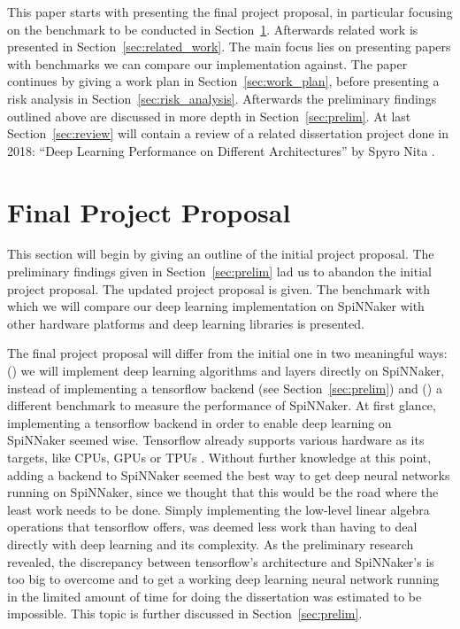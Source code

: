 \documentclass{article}
\begin{document}
This paper starts with presenting the final project
proposal, in particular focusing on the benchmark to be
conducted in Section~\ref{sec:proposal}.
Afterwards related work is presented in
Section~\ref{sec:related_work}.
The main focus lies on presenting papers with benchmarks
we can compare our implementation against.
The paper continues by giving a work plan in
Section~\ref{sec:work_plan}, before presenting a risk
analysis in Section~\ref{sec:risk_analysis}.
Afterwards the preliminary findings outlined above are
discussed in more depth in Section~\ref{sec:prelim}.
At last Section~\ref{sec:review} will contain a review of a
related dissertation project done in 2018:
``Deep Learning Performance on Different Architectures'' by
Spyro Nita \citep{nita_2018}.


\section{Final Project Proposal} %
\label{sec:proposal}

This section will begin by giving an outline of the initial
project proposal.
The preliminary findings given in Section~\ref{sec:prelim}
lad us to abandon the initial project proposal.
The updated project proposal is given.
The benchmark with which we will compare our deep learning
implementation on SpiNNaker with other hardware platforms
and deep learning libraries is presented.

The final project proposal will differ from the initial one
in two meaningful ways: () we will implement
deep learning algorithms and layers directly on SpiNNaker,
instead of implementing a tensorflow backend (see
Section~\ref{sec:prelim}) and () a different
benchmark to measure the performance of SpiNNaker.
At first glance, implementing a tensorflow backend in order to
enable deep learning on SpiNNaker seemed wise.
Tensorflow already supports various hardware as its targets, like
CPUs, GPUs or TPUs \citep{tf2015, jouppi_2016}.
Without further knowledge at this point, adding a backend to SpiNNaker
seemed the best way to get deep neural networks running on SpiNNaker,
since we thought that this would be the road where the least work
needs to be done.
Simply implementing the low-level linear algebra operations that
tensorflow offers, was deemed less work than having to deal directly
with deep learning and its complexity.
As the preliminary research revealed, the discrepancy between
tensorflow's architecture and SpiNNaker's is too big to overcome and
to get a working deep learning neural network running in the limited
amount of time for doing the dissertation was estimated to
be impossible.
This topic is further discussed in Section~\ref{sec:prelim}.
\end{document}
